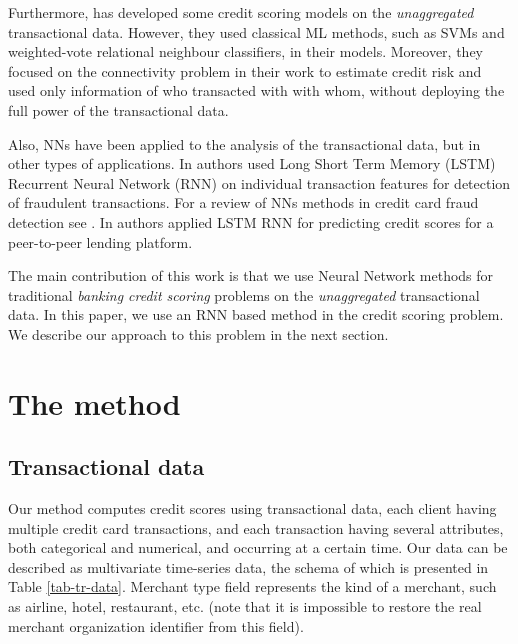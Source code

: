 \documentclass[sigconf]{acmart}
\begin{document}
Furthermore, \cite{RePEc} has developed some credit scoring models on the {\em unaggregated} transactional data. However, they used classical ML methods, such as SVMs and weighted-vote relational neighbour classifiers, in their models. Moreover, they focused on the connectivity problem in their work to estimate credit risk and used only information of who transacted with with whom, without deploying the full power of the transactional data.

Also, NNs have been applied to the analysis of the transactional data, but in other types of applications. In \cite{fraud_lstm} authors used Long Short Term Memory (LSTM) Recurrent Neural Network (RNN) \cite{gers1999learning} on individual transaction features for detection of fraudulent transactions. For a review of NNs methods in credit card fraud detection see \cite{abdallah2016fraud}. In \cite{zhang2017credit}  authors applied LSTM RNN for predicting credit scores for a peer-to-peer lending platform.

The main contribution of this work is that we use Neural Network methods for traditional {\em banking credit scoring} problems on the {\em unaggregated} transactional data. 
In this paper, we use an RNN based method in the credit scoring problem. We describe our approach to this problem in the next section.

\section{The method}

\subsection{Transactional data}

Our method computes credit scores using transactional data,
each client having multiple credit card transactions, and each transaction having several attributes, both categorical and numerical, and occurring at a certain time. Our data can be described as multivariate time-series data, the schema of which is presented in Table \ref{tab-tr-data}. Merchant type field represents the kind of a merchant, such as airline, hotel, restaurant, etc. (note that it is impossible to restore the real merchant organization identifier from this field).
\end{document}
